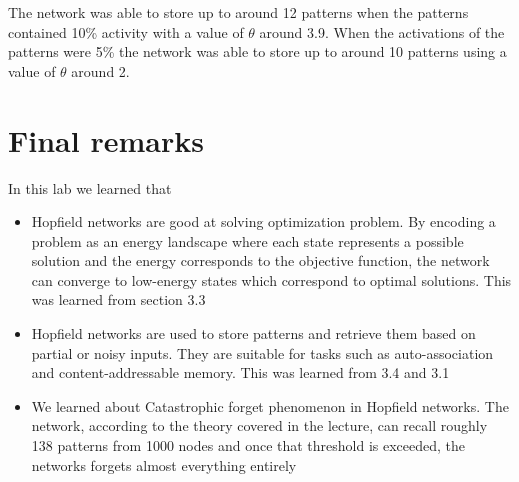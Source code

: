 \documentclass[a4paper]{article}
\begin{document}
The network was able to store up to around 12 patterns when the patterns contained 10\% activity with a value of $\theta$ around 3.9. When the activations of the patterns were 5\% the network was able to store up to around 10 patterns using a value of $\theta$ around 2. 


\section{Final remarks}
In this lab we learned that 
\begin{itemize}
    \item Hopfield networks are good at solving optimization problem. By encoding a problem as an energy landscape where each state represents a possible solution and the energy corresponds to the objective function, the network can converge to low-energy states which correspond to optimal solutions. This was learned from section 3.3 
    \item Hopfield networks are used to store patterns and retrieve them based on partial or noisy inputs. They are suitable for tasks such as auto-association and content-addressable memory. This was learned from 3.4 and 3.1 
    \item We learned about Catastrophic forget phenomenon in Hopfield networks. The network, according to the theory covered in the lecture, can recall roughly 138 patterns from 1000 nodes and once that threshold is exceeded, the networks forgets almost everything entirely 
    \end{itemize}
\end{document}
